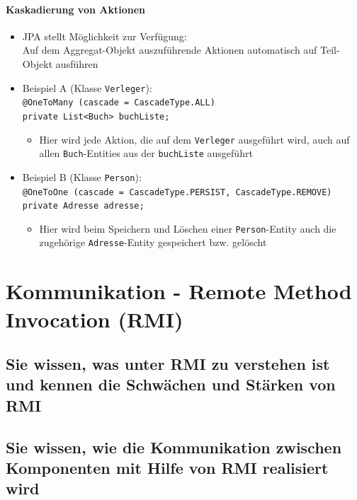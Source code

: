\documentclass[a4paper]{article}
\begin{document}
				\paragraph{Kaskadierung von Aktionen}
				
					\begin{itemize}
						\item JPA stellt Möglichkeit zur Verfügung:\\
						Auf dem Aggregat-Objekt auszuführende Aktionen automatisch auf Teil-Objekt ausführen
						\item Beispiel A (Klasse \texttt{Verleger}):\\
						\texttt{@OneToMany (cascade = CascadeType.ALL)\\
						private List<Buch> buchListe;}
							\begin{itemize}
								\item Hier wird jede Aktion, die auf dem \texttt{Verleger} ausgeführt wird, auch auf allen \texttt{Buch}-Entities aus der \texttt{buchListe} ausgeführt
							\end{itemize}
						\item Beispiel B (Klasse \texttt{Person}):\\
						\texttt{@OneToOne (cascade = {CascadeType.PERSIST, CascadeType.REMOVE})\\
						private Adresse adresse;}
							\begin{itemize}
								\item Hier wird beim Speichern und Löschen einer \texttt{Person}-Entity auch die zugehörige \texttt{Adresse}-Entity gespeichert bzw. gelöscht
							\end{itemize}
					\end{itemize}
		
	\newpage
	\section{Kommunikation - Remote Method Invocation (RMI)}
	
		
		\subsection{Sie wissen, was unter RMI zu verstehen ist und kennen die Schwächen und Stärken von RMI}
		
		
		
		\subsection{Sie wissen, wie die Kommunikation zwischen Komponenten mit Hilfe von RMI realisiert wird}
\end{document}
